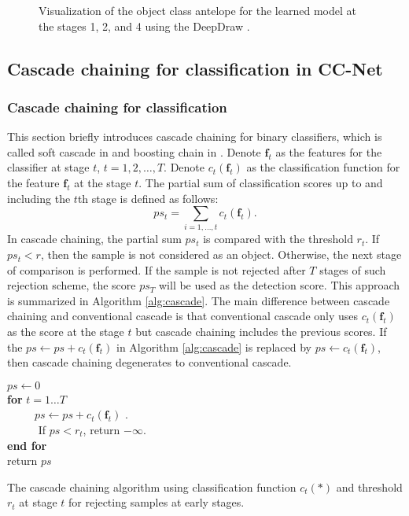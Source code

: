 \documentclass[10pt,twocolumn,letterpaper]{article}
\begin{document}
\begin{figure}
\begin{center}
 \centerline{}
\end{center}
\vspace{-10pt}
   \caption{Visualization of the object class antelope for the learned model at the stages 1, 2, and 4 using the DeepDraw \cite{web:deepDraw}. }
\label{fig:Visualize}
\end{figure}



\subsection{Cascade chaining for classification in CC-Net}
\label{Sec:ClsChain}
\subsubsection{Cascade chaining for classification}
This section briefly introduces cascade chaining for  binary classifiers, which is called soft cascade in \cite{bourdev2005robust} and boosting chain in \cite{xiao2003boosting}. 
Denote $\mathbf{f}_t$ as the features for the classifier at stage $t$, $t=1, 2, \ldots, T$. Denote $c_t(\mathbf{f}_t)$ as the classification function for the feature $\mathbf{f}_t$ at the stage $t$. 
The partial sum of classification scores up to and including the $t$th stage is defined as follows:
\begin{equation}
ps_t = \sum_{i=1, \ldots, t} c_t(\mathbf{f}_t).
\end{equation}
In cascade chaining, the partial sum $ps_t$ is compared with the threshold $r_t$. If  $ps_t<r$, then the sample is not considered as an object. Otherwise, the next stage of comparison is performed. If the sample is not rejected after $T$ stages of such rejection scheme, the score $ps_T$ will be used as the detection score. This approach is summarized in Algorithm \ref{alg:cascade}.
The main difference between cascade chaining and conventional cascade is that conventional cascade only uses $c_t(\mathbf{f}_t)$ as the score at the stage $t$ but cascade chaining includes the previous scores. If the $ps \leftarrow  ps +  c_t(\mathbf{f}_t)$ in Algorithm \ref{alg:cascade}  is replaced by $ps \leftarrow  c_t(\mathbf{f}_t)$, then cascade chaining degenerates to conventional cascade.


\begin{algorithm}[b]
$ps \leftarrow 0$\\
\textbf{for} $t=1 \ldots T$ \\
 ~~~~~$ps \leftarrow  ps +  c_t(\mathbf{f}_t)$ . \\
 ~~~~~ If $ps<r_t$,  return $-\infty$.  \\
\textbf{end for}\\
return $ps$
  \caption{The cascade chaining algorithm using classification function $c_t(*)$  and threshold $r_t$ at stage $t$ for rejecting samples at early stages.}
\label{alg:cascade}
\end{algorithm}
\end{document}
